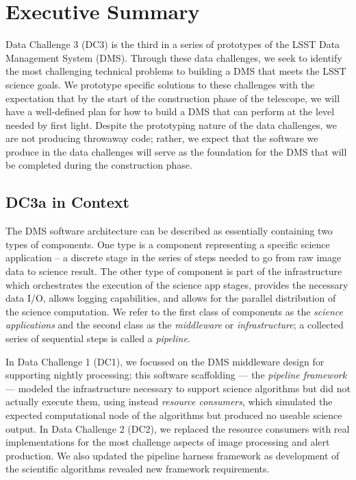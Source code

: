 \pagebreak
\section*{Executive Summary}

Data Challenge 3 (DC3) is the third in a series of prototypes of the
LSST Data Management System (DMS). Through these data challenges, we
seek to identify the most challenging technical problems to building a
DMS that meets the LSST science goals. We prototype specific solutions
to these challenges with the expectation that by the start of the
construction phase of the telescope, we will have a well-defined plan
for how to build a DMS that can perform at the level needed by first
light. Despite the prototyping nature of the data challenges, we are
not producing throwaway code; rather, we expect that the software we
produce in the data challenges will serve as the foundation for the
DMS that will be completed during the construction phase.

\subsection*{DC3a in Context}

The DMS software architecture can be described as essentially
containing two types of components. One type is a component
representing a specific science application -- a discrete stage in the
series of steps needed to go from raw image data to science
result. The other type of component is part of the infrastructure
which orchestrates the execution of the science app stages, provides
the necessary data I/O, allows logging capabilities, and allows for
the parallel distribution of the science computation. We refer to the
first class of components as the \textit{science applications} and the
second class as the \textit{middleware} or \textit{infrastructure}; a
collected series of sequential steps is called a \textit{pipeline}.

In Data Challenge 1 (DC1), we focussed on the DMS middleware design
for supporting nightly processing; this software scaffolding ---
the \textit{pipeline framework} --- modeled the infrastructure
necessary to support science algorithms but did not actually execute
them, using instead \textit{resource consumers}, which simulated the
expected computational node of the algorithms but produced no useable
science output.  In Data Challenge 2 (DC2), we replaced the resource
consumers with real implementations for the most challenge aspects of
image processing and alert production. We also updated the pipeline
harness framework as development of the scientific algorithms revealed
new framework requirements.

